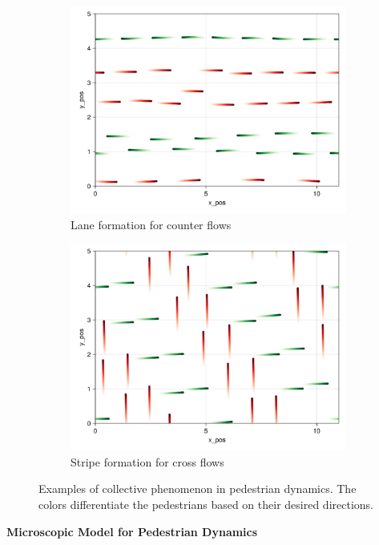 \begin{figure}[H]
    \centering
    \begin{subfigure}{.49\textwidth}
        \centering
        \includegraphics[width=\linewidth]{figures/ch1_lane_stripe/counter_40_2flow_10000.png}
        \caption{Lane formation for counter flows}
        \label{plot:example_cross}
    \end{subfigure}
    \begin{subfigure}{.49\textwidth}
        \centering
        \includegraphics[width=\linewidth]{figures/ch1_lane_stripe/cross_40_2flow_10000.png}
        \caption{Stripe formation for cross flows}
        \label{plot:example_counter}
    \end{subfigure}
    \caption{Examples of collective phenomenon in pedestrian dynamics. The colors differentiate the pedestrians based on their desired directions.}
    \label{plot:examples}
\end{figure}
\textbf{Microscopic Model for Pedestrian Dynamics}


